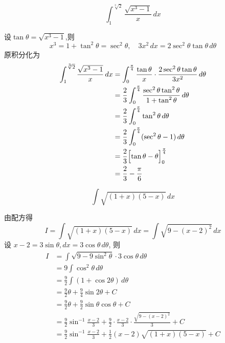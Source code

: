 \begin{questions}
    \question
    \[
    \int_{1}^{\sqrt[3]{2}} \frac{\sqrt{x^{3}-1}}{x} \, dx
    \]
    \begin{solution}
        设$\tan\theta=\sqrt{x^{3}-1}$,则
        \[
        x^{3}=1+\tan^{2}\theta=\sec^{2}\theta,\quad 3x^{2}\, dx=2\sec^{2}\theta\tan\theta \, d\theta
        \]
        原积分化为
        \begin{align*}
        \int_{1}^{\sqrt[3]{2}} \frac{\sqrt{x^{3}-1}}{x} \, dx
        &=\int_{0}^{\frac{\pi}{4}}\frac{\tan\theta}{x}\cdot\frac{2\sec^{2}\theta\tan\theta}{3x^{2}} \, d\theta \\
        &= \frac{2}{3}\int_{0}^{\frac{\pi}{4}}\frac{\sec^{2}\theta\tan^{2}\theta}{1+\tan^{2}\theta} \, d\theta \\
        &= \frac{2}{3}\int_{0}^{\frac{\pi}{4}} \tan^2 \theta \, d\theta\\
        &= \frac{2}{3}\int_{0}^{\frac{\pi}{4}} (\sec^{2}\theta-1) \, d\theta\\
        &= \frac{2}{3}\Bigl[\tan\theta-\theta\Bigr]_{0}^{\frac{\pi}{4}}\\
        &= \frac{2}{3} - \frac{\pi}{6}
        \end{align*}
    \end{solution}

    \question
    \[
    \int \sqrt{(1+x)(5-x)} \, dx
    \]
    \begin{solution}
        由配方得
        \[
        I = \int \sqrt{(1+x)(5-x)} \, dx = \int \sqrt{9-(x-2)^2} \, dx
        \]
        设 $x-2 = 3 \sin \theta, dx = 3 \cos \theta \, d\theta$, 则
        \begin{align*}
        I &= \int \sqrt{9-9\sin^2 \theta} \cdot 3\cos \theta \, d\theta \\
        &= 9 \int \cos^2 \theta \, d\theta \\
        &= \frac{9}{2} \int (1 + \cos 2\theta) \, d\theta \\
        &= \frac{9}{2} \theta + \frac{9}{4} \sin 2\theta + C \\
        &= \frac{9}{2} \theta + \frac{9}{2} \sin \theta \cos \theta + C \\
        &= \frac{9}{2} \sin^{-1} \frac{x-2}{3} + \frac{9}{2} \cdot \frac{x-2}{3} \cdot \frac{\sqrt{9-(x-2)^2}}{3} + C \\
        &= \frac{9}{2} \sin^{-1} \frac{x-2}{3} + \frac{1}{2}(x-2)\sqrt{(1+x)(5-x)} + C
        \end{align*}
    \end{solution}


\end{questions}
